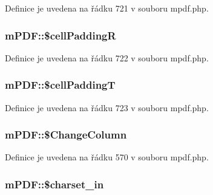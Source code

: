 Definice je uvedena na řádku 721 v souboru mpdf.\-php.

\hypertarget{classm_p_d_f_ae70ff08f2a7aca283fc90729e53195ff}{
\subsubsection[{\$cell\-Padding\-R}]{\setlength{\rightskip}{0pt plus 5cm}m\-P\-D\-F\-::\$cell\-Padding\-R}}\label{classm_p_d_f_ae70ff08f2a7aca283fc90729e53195ff}


Definice je uvedena na řádku 722 v souboru mpdf.\-php.

\hypertarget{classm_p_d_f_a02dbdc3f877989f2d9d43e4799151e58}{
\subsubsection[{\$cell\-Padding\-T}]{\setlength{\rightskip}{0pt plus 5cm}m\-P\-D\-F\-::\$cell\-Padding\-T}}\label{classm_p_d_f_a02dbdc3f877989f2d9d43e4799151e58}


Definice je uvedena na řádku 723 v souboru mpdf.\-php.

\hypertarget{classm_p_d_f_af479c3d0ffe2fa21c84e24d08f04d414}{
\subsubsection[{\$\-Change\-Column}]{\setlength{\rightskip}{0pt plus 5cm}m\-P\-D\-F\-::\$\-Change\-Column}}\label{classm_p_d_f_af479c3d0ffe2fa21c84e24d08f04d414}


Definice je uvedena na řádku 570 v souboru mpdf.\-php.

\hypertarget{classm_p_d_f_af08ee0954b3972836f20c937c027b1f9}{
\subsubsection[{\$charset\-\_\-in}]{\setlength{\rightskip}{0pt plus 5cm}m\-P\-D\-F\-::\$charset\-\_\-in}}\label{classm_p_d_f_af08ee0954b3972836f20c937c027b1f9}


